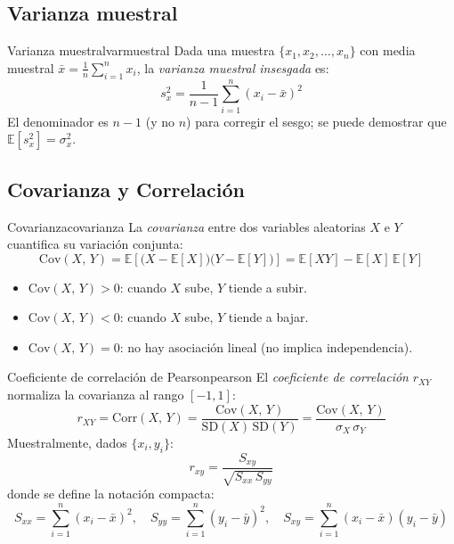\documentclass[12pt, a4paper]{article}
\newcommand{\E}[1]{\mathbb{E}\!\left[#1\right]}
\newcommand{\Cov}[2]{\mathrm{Cov}\!\left(#1,\,#2\right)}
\newcommand{\Corr}[2]{\mathrm{Corr}\!\left(#1,\,#2\right)}
\newcommand{\SD}[1]{\mathrm{SD}\!\left(#1\right)}
\newcommand{\sxx}{S_{xx}}
\newcommand{\syy}{S_{yy}}
\newcommand{\sxy}{S_{xy}}
\newcommand{\sumni}{\sum_{i=1}^{n}}
\begin{document}
\bigskip

\subsection{Varianza muestral}

\begin{definicion}{Varianza muestral}{varmuestral}
Dada una muestra $\{x_1, x_2, \ldots, x_n\}$ con media muestral
$\bar{x} = \frac{1}{n}\sumni x_i$, la \emph{varianza muestral insesgada} es:
\[
  s_x^2 = \frac{1}{n-1}\sumni (x_i - \bar{x})^2
\]
El denominador es $n-1$ (y no $n$) para corregir el sesgo; se puede demostrar
que $\E{s_x^2} = \sigma_x^2$.
\end{definicion}

\bigskip

\subsection{Covarianza y Correlación}

\begin{definicion}{Covarianza}{covarianza}
La \emph{covarianza} entre dos variables aleatorias $X$ e $Y$ cuantifica su
variación conjunta:
\[
  \Cov{X}{Y}
    = \E{\bigl(X - \E{X}\bigr)\bigl(Y - \E{Y}\bigr)}
    = \E{XY} - \E{X}\,\E{Y}
\]
\begin{itemize}[nosep]
  \item $\Cov{X}{Y} > 0$: cuando $X$ sube, $Y$ tiende a subir.
  \item $\Cov{X}{Y} < 0$: cuando $X$ sube, $Y$ tiende a bajar.
  \item $\Cov{X}{Y} = 0$: no hay asociación lineal (no implica independencia).
\end{itemize}
\end{definicion}

\begin{definicion}{Coeficiente de correlación de Pearson}{pearson}
El \emph{coeficiente de correlación} $r_{XY}$ normaliza la covarianza al
rango $[-1, 1]$:
\[
  r_{XY}
    = \Corr{X}{Y}
    = \frac{\Cov{X}{Y}}{\SD{X}\,\SD{Y}}
    = \frac{\Cov{X}{Y}}{\sigma_X\,\sigma_Y}
\]
Muestralmente, dados $\{x_i, y_i\}$:
\[
  r_{xy}
    = \frac{\sxy}{\sqrt{\sxx\,\syy}}
\]
donde se define la notación compacta:
\[
  \sxx = \sumni (x_i-\bar{x})^2,\quad
  \syy = \sumni (y_i-\bar{y})^2,\quad
  \sxy = \sumni (x_i-\bar{x})(y_i-\bar{y})
\]
\end{definicion}
\end{document}
